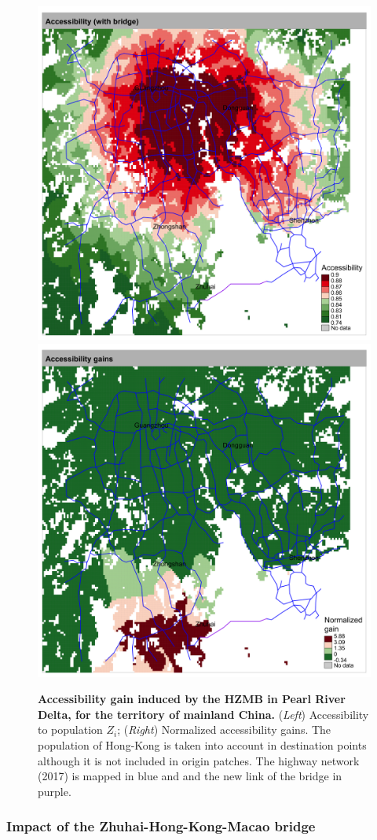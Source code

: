 \begin{figure}
	\includegraphics[width=0.49\linewidth]{figures/accessp_withbridge_prd_EN.png}
	\includegraphics[width=0.49\linewidth]{figures/accesspdiff_prd_EN.png}
	\caption{\textbf{Accessibility gain induced by the HZMB in Pearl River Delta, for the territory of mainland China.} (\textit{Left}) Accessibility to population $Z_i$; (\textit{Right}) Normalized accessibility gains. The population of Hong-Kong is taken into account in destination points although it is not included in origin patches. The highway network (2017) is mapped in blue and and the new link of the bridge in purple. \label{fig:casestudies:prd}}
\end{figure}

\subsubsection{Impact of the Zhuhai-Hong-Kong-Macao bridge}

